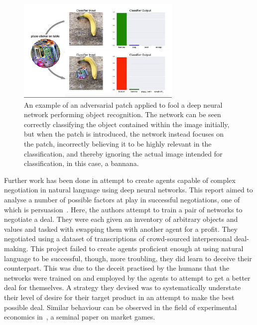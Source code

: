 \begin{figure}[H]
    \centering
    \includegraphics[trim={0, 7mm, 0, 0}, clip, width=0.7\textwidth]{Images/Misc/AdversarialPatches.png}
    \caption{An example of an adversarial patch applied to fool a deep neural network performing object recognition. The network can be seen correctly classifying the object contained within the image initially, but when the patch is introduced, the network instead focuses on the patch, incorrectly believing it to be highly relevant in the classification, and thereby ignoring the actual image intended for classification, in this case, a bannana. }
    \label{fig:adversarial_patch}
\end{figure}

Further work has been done in attempt to create agents capable of complex negotiation in natural language using deep neural networks. This report aimed to analyse a number of possible factors at play in successful negotiations, one of which is persuasion~\cite{Lewis2017DealDialogues}. Here, the authors attempt to train a pair of networks to negotiate a deal. They were each given an inventory of arbitrary objects and values and tasked with swapping them with another agent for a profit. They negotiated using a dataset of transcriptions of crowd-sourced interpersonal deal-making. This project failed to create agents proficient enough at using natural language to be successful, though, more troubling, they did learn to deceive their counterpart. This was due to the deceit practised by the humans that the networks were trained on and employed by the agents to attempt to get a better deal for themselves. A strategy they devised was to systematically understate their level of desire for their target product in an attempt to make the best possible deal. Similar behaviour can be observed in the field of experimental economics in~\cite{Smith1976ExperimentalTheory}, a seminal paper on market games. 

